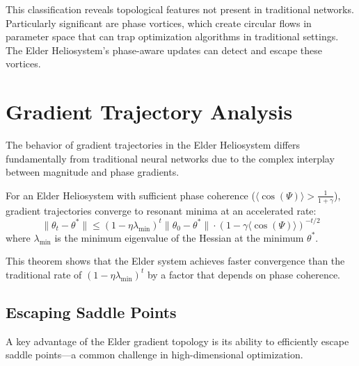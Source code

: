 This classification reveals topological features not present in traditional networks. Particularly significant are phase vortices, which create circular flows in parameter space that can trap optimization algorithms in traditional settings. The Elder Heliosystem's phase-aware updates can detect and escape these vortices.

\section{Gradient Trajectory Analysis}

The behavior of gradient trajectories in the Elder Heliosystem differs fundamentally from traditional neural networks due to the complex interplay between magnitude and phase gradients.

\begin{theorem}
For an Elder Heliosystem with sufficient phase coherence ($\langle\cos(\Psi)\rangle > \frac{1}{1+\gamma}$), gradient trajectories converge to resonant minima at an accelerated rate:
\begin{equation}
\|\theta_t - \theta^*\| \leq (1 - \eta \lambda_{\min})^t \|\theta_0 - \theta^*\| \cdot (1 - \gamma \langle\cos(\Psi)\rangle)^{-t/2}
\end{equation}
where $\lambda_{\min}$ is the minimum eigenvalue of the Hessian at the minimum $\theta^*$.
\end{theorem}

This theorem shows that the Elder system achieves faster convergence than the traditional rate of $(1 - \eta \lambda_{\min})^t$ by a factor that depends on phase coherence.

\subsection{Escaping Saddle Points}

A key advantage of the Elder gradient topology is its ability to efficiently escape saddle points—a common challenge in high-dimensional optimization.

